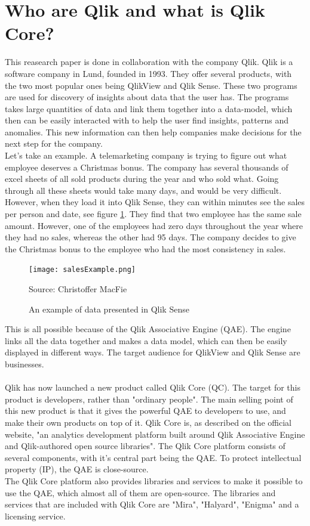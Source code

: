 \documentclass{cslthse-msc}
\newcommand{\source}[1]{\caption*{Source: {#1}} }
\begin{document}
    \section{Who are Qlik and what is Qlik Core?}\label{sec:Qlik}
    This reasearch paper is done in collaboration with the company Qlik.
    Qlik is a software company in Lund, founded in 1993\citep*{qlikBackground}. They offer several products, with the two most popular ones being QlikView and Qlik Sense. These two programs are used for discovery of insights about data that the user has. The programs takes large quantities of data and link them together into a data-model, which then can be easily interacted with to help the user find insights, patterns and anomalies. This new information can then help companies make decisions for the next step for the company.\\ Let's take an example. A telemarketing company is trying to figure out what employee deserves a Christmas bonus. The company has several thousands of excel sheets of all sold products during the year and who sold what. Going through all these sheets would take many days, and would be very difficult. However, when they load it into Qlik Sense, they can within minutes see the sales per person and date, see figure \ref{fig:SenseExample}. They find that two employee has the same sale amount. However, one of the employees had zero days throughout the year where they had no sales, whereas the other had 95 days. The company decides to give the Christmas bonus to the employee who had the most consistency in sales.
    \begin{figure}[H]
        \centering
        \texttt{[image: salesExample.png]}
        \caption{An example of data presented in Qlik Sense}
        \label{fig:SenseExample}
        \source{Christoffer MacFie}
    \end{figure}
    This is all possible because of the Qlik Associative Engine (QAE). The engine links all the data together and makes a data model, which can then be easily displayed in different ways. The target audience for QlikView and Qlik Sense are businesses.\\ \\
    Qlik has now launched a new product called Qlik Core (QC). The target for this product is developers, rather than "ordinary people". The main selling point of this new product is that it gives the powerful QAE to developers to use, and make their own products on top of it.
    Qlik Core is, as described on the official website, "an analytics development platform built around Qlik Associative Engine and Qlik-authored open source libraries"\citep{qlikwebsite}. The Qlik Core platform consists of several components, with it's central part being the QAE. To protect intellectual property (IP), the QAE is close-source.\\ The Qlik Core platform also provides libraries and services to make it possible to use the QAE, which almost all of them are open-source. The libraries and services that are included with Qlik Core are "Mira", "Halyard", "Enigma" and a licensing service.\\
\end{document}
